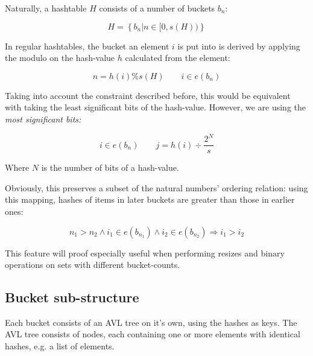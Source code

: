         Naturally, a hashtable $H$ consists of a number of buckets $b_n$:

        \begin{equation}
            H = \left\{ b_n | n \in [0, s(H)) \right\}
        \end{equation}

        In regular hashtables, the bucket an element $i$ is put into is derived
        by applying the modulo on the hash-value $h$ calculated from the
        element:

        \begin{equation}
            n = h(i) \% s(H) \qquad i \in e(b_n)
        \end{equation}

        Taking into account the constraint described before, this would be
        equivalent with taking the least significant bits of the hash-value.
        However, we are using the \em most\em{} significant bits:

        \begin{equation}
            i \in e(b_n) \qquad j = h(i) \div \frac{2^N}{s}
        \end{equation}

        Where $N$ is the number of bits of a hash-value.
        
        Obviously, this preserves a subset of the natural numbers' ordering
        relation: using this mapping, hashes of items in later buckets are
        greater than those in earlier ones:

        \begin{equation}
            n_1 > n_2 \land i_1 \in e(b_{n_1}) \land i_2 \in e(b_{n_2})
            \Rightarrow i_1 > i_2
        \end{equation}

        This feature will proof especially useful when performing resizes and
        binary operations on sets with different bucket-counts.

    \subsection{Bucket sub-structure}
    \label{sec:data_layout-bucketstruct}

        Each bucket consists of an AVL tree on it's own, using the hashes as
        keys.
        The AVL tree consists of nodes, each containing one or more elements
        with identical hashes, e.g. a list of elements.


